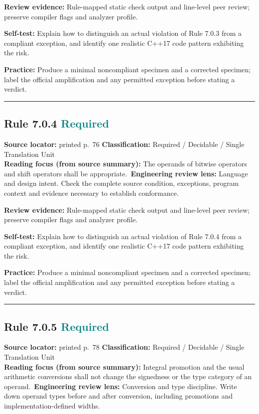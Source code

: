 \documentclass[10pt,letterpaper]{article}
\begin{document}
\textbf{Review evidence:} Rule-mapped static check output and line-level peer review; preserve compiler flags and analyzer profile.

\textbf{Self-test:} Explain how to distinguish an actual violation of Rule 7.0.3 from a compliant exception, and identify one realistic C++17 code pattern exhibiting the risk.\par
\textbf{Practice:} Produce a minimal noncompliant specimen and a corrected specimen; label the official amplification and any permitted exception before stating a verdict.
\smallskip\hrule\smallskip
\subsection*{Rule 7.0.4 \enspace \texorpdfstring{\small\textcolor{teal}{Required}}{Required}}
\noindent\textbf{Source locator:} printed p.~76 \quad\textbf{Classification:} Required / Decidable / Single Translation Unit\\
\textbf{Reading focus (from source summary):} The operands of bitwise operators and shift operators shall be appropriate.\
\textbf{Engineering review lens:} Language and design intent. Check the complete source condition, exceptions, program context and evidence necessary to establish conformance.

\textbf{Review evidence:} Rule-mapped static check output and line-level peer review; preserve compiler flags and analyzer profile.

\textbf{Self-test:} Explain how to distinguish an actual violation of Rule 7.0.4 from a compliant exception, and identify one realistic C++17 code pattern exhibiting the risk.\par
\textbf{Practice:} Produce a minimal noncompliant specimen and a corrected specimen; label the official amplification and any permitted exception before stating a verdict.
\smallskip\hrule\smallskip
\subsection*{Rule 7.0.5 \enspace \texorpdfstring{\small\textcolor{teal}{Required}}{Required}}
\noindent\textbf{Source locator:} printed p.~78 \quad\textbf{Classification:} Required / Decidable / Single Translation Unit\\
\textbf{Reading focus (from source summary):} Integral promotion and the usual arithmetic conversions shall not change the signedness or the type category of an operand.\
\textbf{Engineering review lens:} Conversion and type discipline. Write down operand types before and after conversion, including promotions and implementation-defined widths.
\end{document}
